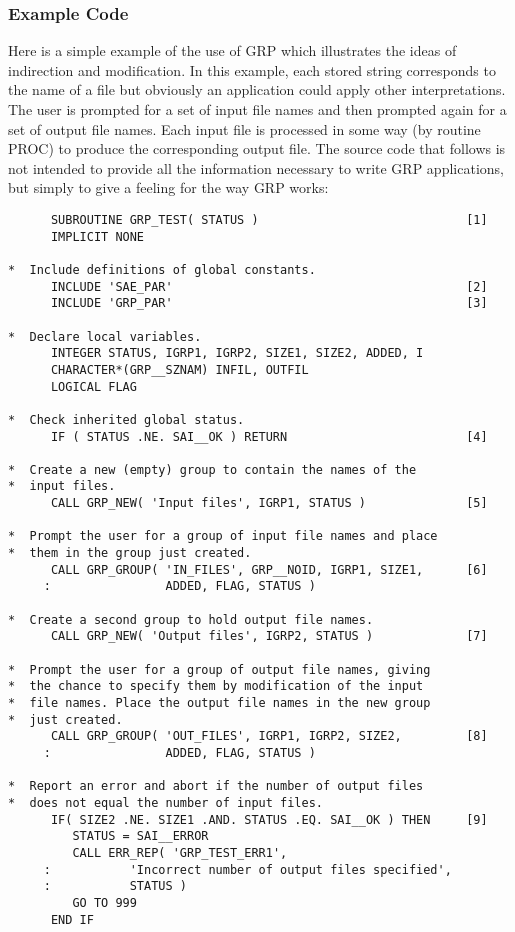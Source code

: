\subsubsection{Example Code}
Here is a simple example of the use of GRP which illustrates the ideas of
indirection and modification. In this example, each stored string corresponds to
the name of a file but obviously an application could apply other
interpretations. The user is prompted for a set of input file names and then
prompted again for a set of output file names. Each input file is processed in
some way (by routine PROC) to produce the corresponding output file. The source
code that follows is not intended to provide all the information necessary to
write GRP applications, but simply to give a feeling for the way GRP works:
\small
\begin{verbatim}
      SUBROUTINE GRP_TEST( STATUS )                             [1]
      IMPLICIT NONE

*  Include definitions of global constants.
      INCLUDE 'SAE_PAR'                                         [2]
      INCLUDE 'GRP_PAR'                                         [3]

*  Declare local variables.
      INTEGER STATUS, IGRP1, IGRP2, SIZE1, SIZE2, ADDED, I
      CHARACTER*(GRP__SZNAM) INFIL, OUTFIL
      LOGICAL FLAG

*  Check inherited global status.
      IF ( STATUS .NE. SAI__OK ) RETURN                         [4]

*  Create a new (empty) group to contain the names of the
*  input files.
      CALL GRP_NEW( 'Input files', IGRP1, STATUS )              [5]

*  Prompt the user for a group of input file names and place
*  them in the group just created.
      CALL GRP_GROUP( 'IN_FILES', GRP__NOID, IGRP1, SIZE1,      [6]
     :                ADDED, FLAG, STATUS )

*  Create a second group to hold output file names.
      CALL GRP_NEW( 'Output files', IGRP2, STATUS )             [7]

*  Prompt the user for a group of output file names, giving
*  the chance to specify them by modification of the input
*  file names. Place the output file names in the new group
*  just created.
      CALL GRP_GROUP( 'OUT_FILES', IGRP1, IGRP2, SIZE2,         [8]
     :                ADDED, FLAG, STATUS )

*  Report an error and abort if the number of output files
*  does not equal the number of input files.
      IF( SIZE2 .NE. SIZE1 .AND. STATUS .EQ. SAI__OK ) THEN     [9]
         STATUS = SAI__ERROR
         CALL ERR_REP( 'GRP_TEST_ERR1',
     :           'Incorrect number of output files specified',
     :           STATUS )
         GO TO 999
      END IF


\end{verbatim}
